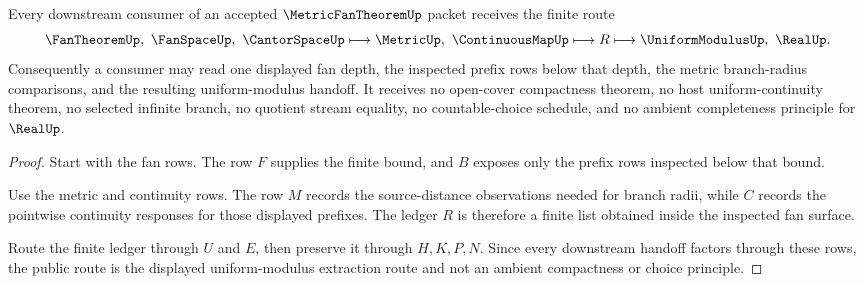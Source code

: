 \begin{theorem}
\label{thm:metric-fan-theorem-uniform-modulus-route}
Every downstream consumer of an accepted $\MetricFanTheoremUp$ packet receives the finite route
$$
\FanTheoremUp,\ \FanSpaceUp,\ \CantorSpaceUp
\longmapsto
\MetricUp,\ \ContinuousMapUp
\longmapsto
R
\longmapsto
\UniformModulusUp,\ \RealUp .
$$
Consequently a consumer may read one displayed fan depth, the inspected prefix rows below that depth, the metric branch-radius comparisons, and the resulting uniform-modulus handoff. It receives no open-cover compactness theorem, no host uniform-continuity theorem, no selected infinite branch, no quotient stream equality, no countable-choice schedule, and no ambient completeness principle for $\RealUp$.
\end{theorem}
\begin{proof}
Start with the fan rows. The row $F$ supplies the finite bound, and $B$ exposes only the prefix rows inspected below that bound.

Use the metric and continuity rows. The row $M$ records the source-distance observations needed for branch radii, while $C$ records the pointwise continuity responses for those displayed prefixes. The ledger $R$ is therefore a finite list obtained inside the inspected fan surface.

Route the finite ledger through $U$ and $E$, then preserve it through $H,K,P,N$. Since every downstream handoff factors through these rows, the public route is the displayed uniform-modulus extraction route and not an ambient compactness or choice principle.
\end{proof}


\begin{closurestatus}{\MetricFanTheoremUp}
  \theoryclosure{\seedClosure}
  \formalstatus{\unformalizedV}
\end{closurestatus}
